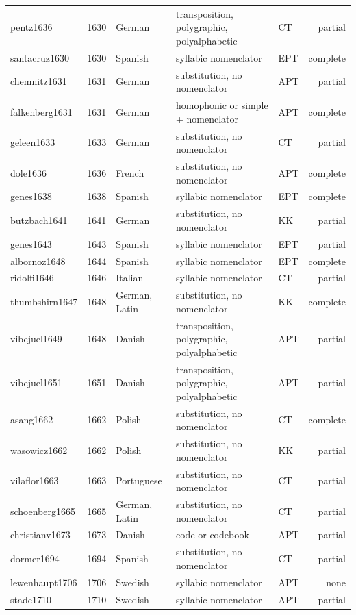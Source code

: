 {\begin{longtable}{@{}lrlllr@{}}
pentz1636 & 1630 & German & transposition, polygraphic, polyalphabetic & CT & partial \\
santacruz1630 & 1630 & Spanish & syllabic nomenclator & EPT & complete \\
chemnitz1631 & 1631 & German & substitution, no nomenclator & APT & partial \\
falkenberg1631 & 1631 & German & homophonic or simple + nomenclator & APT & complete \\
geleen1633 & 1633 & German & substitution, no nomenclator & CT & partial \\
dole1636 & 1636 & French & substitution, no nomenclator & APT & complete \\
genes1638 & 1638 & Spanish & syllabic nomenclator & EPT & complete \\
butzbach1641 & 1641 & German & substitution, no nomenclator & KK & partial \\
genes1643 & 1643 & Spanish & syllabic nomenclator & EPT & partial \\
albornoz1648 & 1644 & Spanish & syllabic nomenclator & EPT & complete \\
ridolfi1646 & 1646 & Italian & syllabic nomenclator & CT & partial \\
thumbshirn1647 & 1648 & German, Latin & substitution, no nomenclator & KK & complete \\
vibejuel1649 & 1648 & Danish & transposition, polygraphic, polyalphabetic & APT & partial \\
vibejuel1651 & 1651 & Danish & transposition, polygraphic, polyalphabetic & APT & partial \\
asang1662 & 1662 & Polish & substitution, no nomenclator & CT & complete \\
wasowicz1662 & 1662 & Polish & substitution, no nomenclator & KK & partial \\
vilaflor1663 & 1663 & Portuguese & substitution, no nomenclator & CT & partial \\
schoenberg1665 & 1665 & German, Latin & substitution, no nomenclator & CT & partial \\
christianv1673 & 1673 & Danish & code or codebook & APT & partial \\
dormer1694 & 1694 & Spanish & substitution, no nomenclator & CT & partial \\
lewenhaupt1706 & 1706 & Swedish & syllabic nomenclator & APT & none \\
stade1710 & 1710 & Swedish & syllabic nomenclator & APT & partial \\

\end{longtable}}
